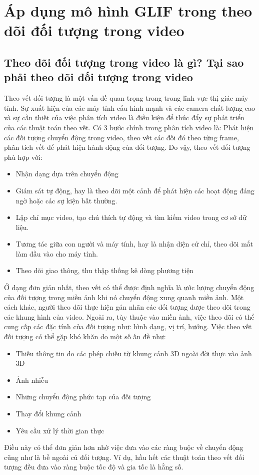 \documentclass[14pt,oneside,a4paper]{extreport}
\begin{document}
\chapter{Áp dụng mô hình GLIF trong theo dõi đối tượng trong video }
\section{Theo dõi đối tượng trong video là gì? Tại sao phải theo dõi đối tượng trong video}
Theo vết đối tượng là một vấn đề quan trọng trong trong lĩnh vực thị giác máy tính. Sự xuất hiện của các máy tính cấu hình mạnh và các camera chất lượng cao và sự cần thiết của việc phân tích video  là điều kiện để thúc đẩy sự phát triển của các thuật toán theo vết. Có 3 bước chính trong phân tích video là: Phát hiện các đối tượng chuyển động trong video, theo vết các đối đó theo từng frame, phân tích vết để phát hiện hành động của đối tượng. Do vậy, theo vết đối tượng phù hợp với: 
\begin{itemize}
\item Nhận dạng dựa trên chuyển động
\item Giám sát tự động, hay là theo dõi một cảnh để phát hiện các hoạt động đáng ngờ hoặc các sự kiện bất thường.
\item Lập chỉ mục video, tạo chú thích tự động và tìm kiếm video trong cơ sở dữ liệu.
\item Tương tác giữa con người và máy tính, hay là nhận diện cử chỉ, theo dõi mắt làm đầu vào cho máy tính. 
\item Theo dõi giao thông, thu thập thống kê dòng phương tiện
\end{itemize}
Ở dạng đơn giản nhất, theo vết có thể được định nghĩa là ước lượng chuyển động của đối tượng trong miền ảnh khi nó chuyển động xung quanh miền ảnh. Một cách khác, người theo dõi thực hiện gán nhãn các đối tượng được theo dõi trong các khung hình của video. Ngoài ra, tùy thuộc vào miền ảnh, việc theo dõi có thể cung cấp các đặc tính của đối tượng như: hình dạng, vị trí, hướng. Việc theo vết đối tượng có thể gặp khó khăn do một số ấn đề như: 
\begin{itemize}
\item Thiếu thông tin do các phép chiếu từ khung cảnh 3D ngoài đời thực vào ảnh 3D
\item Ảnh nhiễu
\item Những chuyển động phức tạp của đối tượng
\item Thay đổi khung cảnh
\item Yêu cầu xử lý thời gian thực
\end{itemize} 
Điều này có thể đơn giản hơn nhờ việc đưa vào các ràng buộc về chuyển động cũng như là bề ngoài củ đối tượng. Ví dụ, hầu hết các thuật toán theo vết đối tượng đều đưa vào ràng buộc tốc độ và gia tốc là hằng số. 
\end{document}

